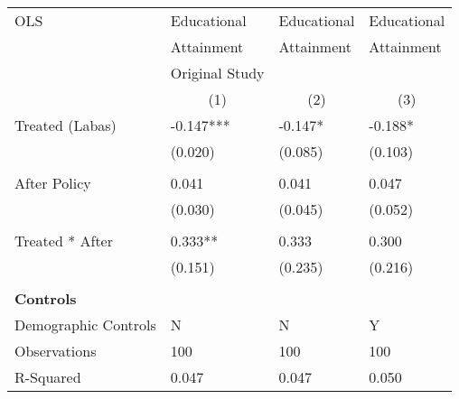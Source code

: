 \begin{tabular}{p{4cm}p{1.5cm}p{1.5cm}p{1.5cm}}
\hline\hline
OLS               &Educational & Educational &Educational \\
&Attainment &Attainment &Attainment \\
&Original Study & &  \\
&\multicolumn{1}{c}{(1)}&\multicolumn{1}{c}{(2)}&\multicolumn{1}{c}{(3)}\\
\hline
Treated (Labas)   &  -0.147***&   -0.147* & -0.188* \\
                &  (0.020)&  (0.085) & (0.103)\\
                \\
After Policy   &   0.041&   0.041 &0.047\\
                &  (0.030)&  (0.045) & (0.052)\\
                \\
Treated * After   &  0.333**&  0.333 & 0.300\\
                &  (0.151)&  (0.235) &(0.216)\\
                \\

\multicolumn{6}{l}{\textbf{Controls}}  \\                  
Demographic Controls       &   N     &        N&        Y\\

\hline
Observations    &    100&    100 & 100\\
R-Squared    &  0.047   & 0.047 & 0.050     \\
\hline\hline
\end{tabular}